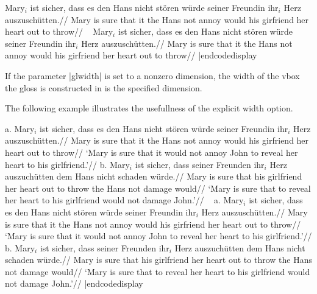 \framedisplay
\ex[exno={[(6), p. 14]}]
\begingl
\gla Mary$_i$ ist sicher, dass es den Hans nicht st\"oren w\"urde
seiner Freundin ihr$_i$ Herz auszusch\"utten.//
\glb Mary is sure that it the Hans not annoy would
his girfriend her heart {out to
throw}//
\endgl
\xe
\endframedisplay
\codedisplay~
\ex[exno={[(6), p. 14]}]
\begingl
\gla Mary$_i$ ist sicher, dass es den Hans nicht st\"oren w\"urde
seiner Freundin ihr$_i$ Herz auszusch\"utten.//
\glb Mary is sure that it the Hans not annoy would
his girfriend her heart {out to
throw}//
\endgl
\xe
|endcodedisplay

If the parameter |glwidth| is set to a nonzero dimension, the width of
the vbox the gloss is constructed in is the specified dimension.

The following example illustrates the usefullness of the explicit
width option.

\ex
a.\quad
\begingl[glwidth=2.6in]
\gla Mary$_i$ ist sicher, dass es den Hans nicht st\"oren w\"urde
seiner Freundin ihr$_i$ Herz auszusch\"utten.//
\glb Mary is sure that it the Hans not annoy would
his girfriend her heart {out to
throw}//
\glft  `Mary is sure that it would not annoy John to reveal her
heart to his girlfriend.'//
\endgl
\hfil
b.\quad
\begingl[glwidth=2.6in]
\gla Mary$_i$ ist sicher, dass seiner Freunden ihr$_i$ Herz
auszuch\"utten dem Hans nicht schaden w\"urde.//
\glb Mary is sure that his girlfriend her
heart {out to throw} the Hans not damage would//
\glft `Mary is sure that to reveal her heart to his girlfriend
would not damage John.'//
\endgl
\xe
\codedisplay~
\ex
a.\quad
\begingl[glwidth=2.6in]
\gla Mary$_i$ ist sicher, dass es den Hans nicht st\"oren w\"urde
seiner Freundin ihr$_i$ Herz auszusch\"utten.//
\glb Mary is sure that it the Hans not annoy would
his girfriend her heart {out to
throw}//
\glft  `Mary is sure that it would not annoy John to reveal her
heart to his girlfriend.'//
\endgl
\hfil
b.\quad
\begingl[glwidth=2.6in]
\gla Mary$_i$ ist sicher, dass seiner Freunden ihr$_i$ Herz
auszuch\"utten dem Hans nicht schaden w\"urde.//
\glb Mary is sure that his girlfriend her
heart {out to throw} the Hans not damage would//
\glft `Mary is sure that to reveal her heart to his girlfriend
would not damage John.'//
\endgl
\xe
|endcodedisplay


